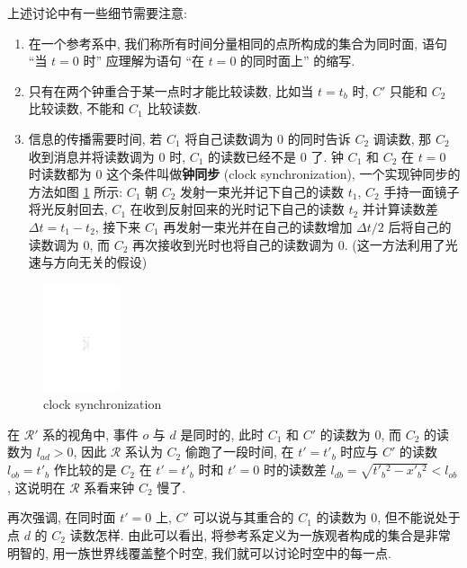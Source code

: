 \begin{remark}
    上述讨论中有一些细节需要注意:
    \begin{enumerate}
        \item 在一个参考系中, 我们称所有时间分量相同的点所构成的集合为同时面, 语句 ``当 $ t=0 $ 时'' 应理解为语句 ``在 $ t=0 $ 的同时面上'' 的缩写.
        \item 只有在两个钟重合于某一点时才能比较读数, 比如当 $ t=t_b $ 时, $ C' $ 只能和 $ C_2 $ 比较读数, 不能和 $ C_1 $ 比较读数.
        \item 信息的传播需要时间, 若 $ C_1 $ 将自己读数调为 $ 0 $ 的同时告诉 $ C_2 $ 调读数, 那 $ C_2 $ 收到消息并将读数调为 $ 0 $ 时, $ C_1 $ 的读数已经不是 $ 0 $ 了. 钟 $ C_1 $ 和 $ C_2 $ 在 $ t=0 $ 时读数都为 $ 0 $ 这个条件叫做{\bf 钟同步} (clock synchronization), 一个实现钟同步的方法如图 \ref{clock synchronization} 所示: $ C_1 $ 朝 $ C_2 $ 发射一束光并记下自己的读数 $ t_1 $, $ C_2 $ 手持一面镜子将光反射回去, $ C_1 $ 在收到反射回来的光时记下自己的读数 $ t_2 $ 并计算读数差 $ \Delta t=t_1-t_2 $, 接下来 $ C_1 $ 再发射一束光并在自己的读数增加 $ \Delta t/2$ 后将自己的读数调为 $ 0 $, 而 $ C_2 $ 再次接收到光时也将自己的读数调为 $ 0 $. (这一方法利用了光速与方向无关的假设)
    \end{enumerate}
    \begin{figure}[htbp]
        \centering
        \includegraphics[width=0.2\textwidth]{pic/clock synchronization.pdf}
        \caption{clock synchronization}
        \label{clock synchronization}
    \end{figure}
\end{remark}

在 $ \mathcal{R}' $ 系的视角中, 事件 $ o $ 与 $ d $ 是同时的, 此时 $ C_1 $ 和 $ C' $ 的读数为 $ 0 $, 而 $ C_2 $ 的读数为 $ l_{ad}>0 $, 因此 $ \mathcal{R} $ 系认为 $ C_2 $ 偷跑了一段时间, 在 $ t'=t'_b $ 时应与 $ C' $ 的读数 $ l_{ob}=t'_b $ 作比较的是 $ C_2 $ 在 $ t'=t'_b $ 时和 $ t'=0 $ 时的读数差 $ l_{db}=\sqrt{t'_b{}^2-x'_b{}^2}<l_{ob}$, 这说明在 $ \mathcal{R} $ 系看来钟 $ C_2 $ 慢了.

\begin{remark}
    再次强调, 在同时面 $ t'=0 $ 上, $ C' $ 可以说与其重合的 $ C_1 $ 的读数为 $ 0 $, 但不能说处于点 $ d $ 的 $ C_2 $ 读数怎样. 由此可以看出, 将参考系定义为一族观者构成的集合是非常明智的, 用一族世界线覆盖整个时空, 我们就可以讨论时空中的每一点.
\end{remark}

